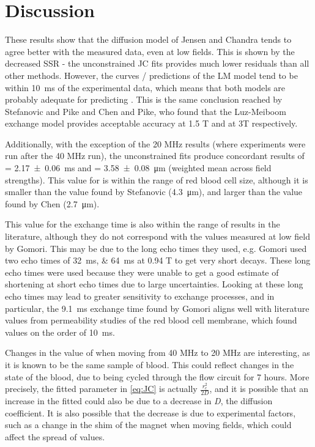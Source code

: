 \section{Discussion}
These results show that the diffusion model of Jensen and Chandra tends to agree better with the measured data, even at low fields.
This is shown by the decreased SSR - the unconstrained JC fits provides much lower residuals than all other methods.
However, the curves / predictions of the LM model tend to be within \SI{10}{ms} of the experimental data, which means that both models are probably adequate for predicting \Ttwo.
This is the same conclusion reached by Stefanovic and Pike and Chen and Pike, who found that the Luz-Meiboom exchange model provides acceptable accuracy at 1.5 T and at 3T respectively.

Additionally, with the exception of the 20 MHz results (where experiments were run after the 40 MHz run), the unconstrained fits produce concordant results of \Texc = \SI{2.17\pm0.06}{ms} and \rc = \SI{3.58 \pm 0.08}{\micro\metre} (weighted mean across field strengths).
This value for \rc is within the range of red blood cell size, although it is smaller than the value found by Stefanovic (\SI{4.3}{\micro\metre})\cite{StefanovicHumanwholebloodrelaxometry2004}, and larger than the value found by Chen (\SI{2.7}{\micro\metre})\cite{ChenHumanwholeblood2009}.

This value for the exchange time is also within the range of results in the literature, although they do not correspond with the values measured at low field by Gomori\cite{GomoriNMRRelaxationTimes1987}.
This may be due to the long echo times they used, e.g. Gomori used two echo times of \SIlist{32;64}{ms} at 0.94 T to get very short \Ttwo decays.
These long echo times were used because they were unable to get a good estimate of \Ttwo shortening at short echo times due to large uncertainties.
Looking at these long echo times may lead to greater sensitivity to exchange processes, and in particular, the \SI{9.1}{ms} exchange time found by Gomori aligns well with literature values from permeability studies of the red blood cell membrane, which found values on the order of \SI{10}{ms}\cite{Herbstreviewwaterdiffusion1989}.

Changes in the value of \rc when moving from 40 MHz to 20 MHz are interesting, as it is known to be the same sample of blood.
This could reflect changes in the state of the blood, due to being cycled through the flow circuit for 7 hours.
More precisely, the fitted parameter in \autoref{eq:JC} is actually $\mathit{\frac{r_c^2}{2D}}$, and it is possible that an increase in the fitted \rc could also be due to a decrease in \textit{D}, the diffusion coefficient.
It is also possible that the decrease is due to experimental factors, such as a change in the shim of the magnet when moving fields, which could affect the spread of \Ttwo values.

